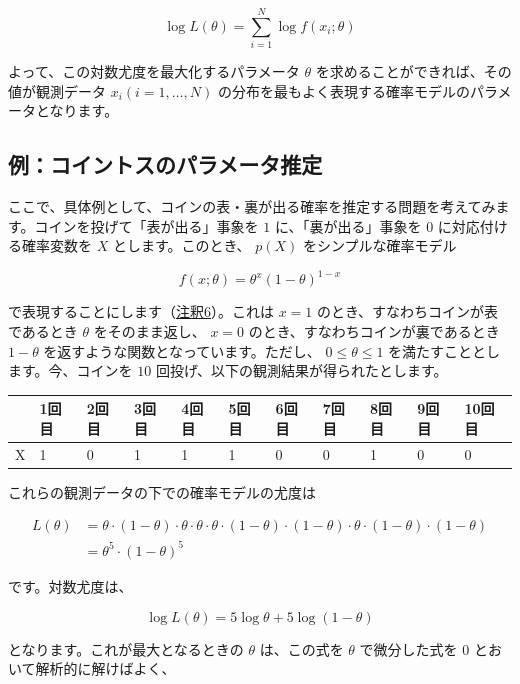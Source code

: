\[
\log L(\theta) = \sum_{i=1}^N \log f(x_i; \theta)
\]


よって、この対数尤度を最大化するパラメータ $\theta$ を求めることができれば、その値が観測データ $x_i (i=1,\dots,N)$ の分布を最もよく表現する確率モデルのパラメータとなります。


\subsection{例：コイントスのパラメータ推定}


ここで、具体例として、コインの表・裏が出る確率を推定する問題を考えてみます。コインを投げて「表が出る」事象を $1$ に、「裏が出る」事象を $0$ に対応付ける確率変数を $X$ とします。このとき、 $p(X)$ をシンプルな確率モデル


\[
f(x; \theta) = \theta^x (1 - \theta)^{1 - x}
\]


で表現することにします（\hyperref[06b-basics-of-probability-statistics-note6]{注釈6}）。これは $x = 1$ のとき、すなわちコインが表であるとき $\theta$ をそのまま返し、 $x = 0$ のとき、すなわちコインが裏であるとき $1 - \theta$ を返すような関数となっています。ただし、 $0 \leq \theta \leq 1$ を満たすこととします。今、コインを $10$ 回投げ、以下の観測結果が得られたとします。


\begin{center}
\begin{tabular}{|l|l|l|l|l|l|l|l|l|l|l|}
\hline
$\ $ & 1回目 & 2回目 & 3回目 & 4回目 & 5回目 & 6回目 & 7回目 & 8回目 & 9回目 & 10回目 \\
\hline
X & 1 & 0 & 1 & 1 & 1 & 0 & 0 & 1 & 0 & 0 \\
\hline
\end{tabular}
\end{center}


これらの観測データの下での確率モデルの尤度は


\[
\begin{aligned}
L(\theta) &=
\theta \cdot
(1 - \theta) \cdot
\theta \cdot
\theta \cdot
\theta \cdot
(1 - \theta) \cdot
(1 - \theta) \cdot
\theta \cdot
(1 - \theta) \cdot
(1 - \theta) \\
&= \theta^{5} \cdot (1 - \theta)^{5}
\end{aligned}
\]


です。対数尤度は、


\[
\log L(\theta) = 5 \log \theta + 5 \log \left( 1 - \theta \right)
\]


となります。これが最大となるときの $\theta$ は、この式を $\theta$ で微分した式を $0$ とおいて解析的に解けばよく、


